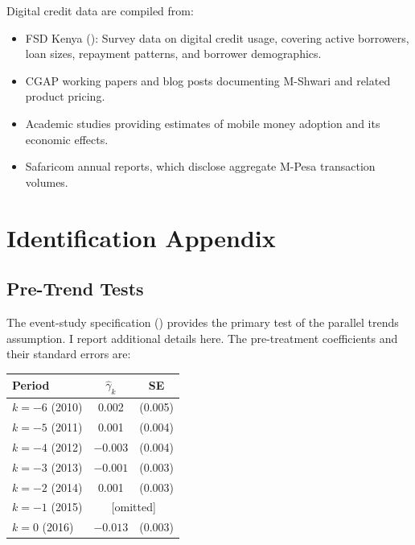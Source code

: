 \documentclass[12pt]{article}
\begin{document}
Digital credit data are compiled from:
\begin{itemize}
    \item FSD Kenya (\citeyear{totolo2018digital}): Survey data on digital credit usage, covering active borrowers, loan sizes, repayment patterns, and borrower demographics.
    \item CGAP working papers and blog posts documenting M-Shwari and related product pricing.
    \item Academic studies \citep{bharadwaj2019fintech, mbiti2011mobile} providing estimates of mobile money adoption and its economic effects.
    \item Safaricom annual reports, which disclose aggregate M-Pesa transaction volumes.
\end{itemize}


\section{Identification Appendix}
\label{app:identification}

\subsection{Pre-Trend Tests}

The event-study specification () provides the primary test of the parallel trends assumption. I report additional details here. The pre-treatment coefficients and their standard errors are:

\begin{center}
\begin{tabular}{lcc}
\toprule
Period & $\hat{\gamma}_k$ & SE \\
\midrule
$k = -6$ (2010) & 0.002 & (0.005) \\
$k = -5$ (2011) & 0.001 & (0.004) \\
$k = -4$ (2012) & $-0.003$ & (0.004) \\
$k = -3$ (2013) & $-0.001$ & (0.003) \\
$k = -2$ (2014) & 0.001 & (0.003) \\
$k = -1$ (2015) & \multicolumn{2}{c}{[omitted]} \\
$k = 0$ (2016) & $-0.013$ & (0.003) \\
\bottomrule
\end{tabular}
\end{center}
\end{document}
